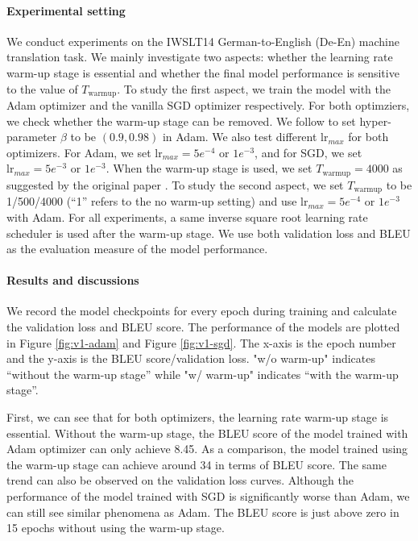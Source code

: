 \documentclass{article}
\begin{document}
\paragraph{Experimental setting} %
We conduct experiments on the IWSLT14 German-to-English (De-En) machine translation task. We mainly investigate two aspects: whether the learning rate warm-up stage is essential and whether the final model performance is sensitive to the value of $T_{\text{warmup}}$. To study the first aspect, we train the model with the Adam optimizer \citep{kingma2014adam} and the vanilla SGD optimizer \citep{ruder2016overview} respectively. For both optimziers, we check whether the warm-up stage can be removed. We follow \citet{vaswani2017attention} to set hyper-parameter $\beta$ to be $(0.9,0.98)$ in Adam. We also test different $\text{lr}_{max}$ for both optimizers. For Adam, we set $\text{lr}_{max}=5e^{-4}$ or $1e^{-3}$, and for SGD, we set $\text{lr}_{max}=5e^{-3}$ or $1e^{-3}$. When the warm-up stage is used, we set $T_{\text{warmup}}=4000$ as suggested by the original paper \citep{vaswani2017attention}. To study the second aspect, we set $T_{\text{warmup}}$ to be 1/500/4000 (``1'' refers to the no warm-up setting) and use $\text{lr}_{max}=5e^{-4}$ or $1e^{-3}$ with Adam. For all experiments, a same inverse square root learning rate scheduler is used after the warm-up stage. We use both validation loss and BLEU \citep{papineni2002bleu} as the evaluation measure of the model performance.


\paragraph{Results and discussions} We record the model checkpoints for every epoch during training and calculate the validation loss and BLEU score. The performance of the models are plotted in Figure \ref{fig:v1-adam} and Figure \ref{fig:v1-sgd}. The x-axis is the epoch number and the y-axis is the BLEU score/validation loss. "w/o warm-up" indicates ``without the warm-up stage'' while "w/ warm-up" indicates ``with the warm-up stage''.

First, we can see that for both optimizers, the learning rate warm-up stage is essential. Without the warm-up stage, the BLEU score of the model trained with Adam optimizer can only achieve 8.45. As a comparison, the model trained using the warm-up stage can achieve around 34 in terms of BLEU score. The same trend can also be observed on the validation loss curves. Although the performance of the model trained with SGD is significantly worse than Adam, we can still see similar phenomena as Adam. The BLEU score is just above zero in 15 epochs without using the warm-up stage. 
\end{document}
